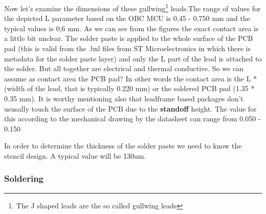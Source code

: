 \documentclass[final]{cubedoc}
\begin{document}
	
	
	
	
	Now let's examine the dimensions of these gullwing\footnote{The J shaped leads are the so called gullwing leads} leads.The range of values for the depicted L parameter based on the OBC MCU is 0,45 - 0,750 mm and the typical values is 0,6 mm. As we can see from the figures the exact contact area is a little bit unclear. The solder paste is applied to the whole surface of the PCB pad (this is valid from the .bxl files from ST Microelectronics in which there is metadata for the solder paste layer) and only the L part of the lead is attached to the solder. But all together are electrical and thermal conductive. So we can assume as contact area the PCB pad? In other words the contact area is the L * (width of the lead, that is typically 0.220 mm) or the soldered PCB pad (1.35 * 0.35 mm). It is worthy mentioning also that leadframe based packages don't ususally touch the surface of the PCB due to the \textbf{standoff} height. The value for this according to the mechanical drawing by the datasheet can range from 0.050 - 0.150
	
	In order to determine the thickness of the solder paste we need to know the stencil design. A typical value will be 130um.
	\newline
	
	
	\subsubsection{Soldering}
	
	
\end{document}
